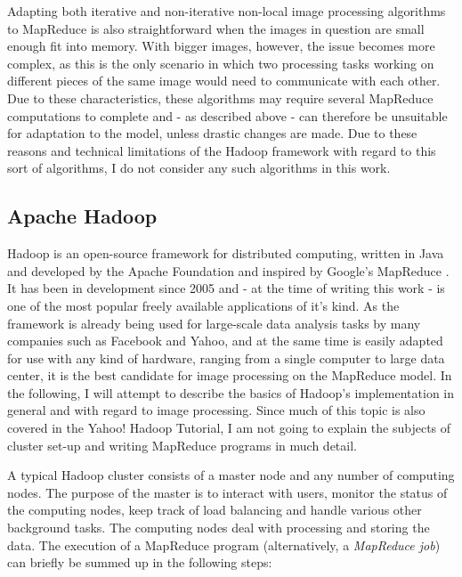 \documentclass [12pt,a4paper]{report}
\begin{document}
Adapting both iterative and non-iterative non-local image processing algorithms to MapReduce is also straightforward when the images in question are small enough fit into memory. With bigger images, however, the issue becomes more complex, as this is the only scenario in which two processing tasks working on different pieces of the same image would need to communicate with each other. Due to these characteristics, these algorithms may require several MapReduce computations to complete and - as described above - can therefore be unsuitable for adaptation to the model, unless drastic changes are made. Due to these reasons and technical limitations of the Hadoop framework with regard to this sort of algorithms, I do not consider any such algorithms in this work.

\subsection{Apache Hadoop}
Hadoop is an open-source framework for distributed computing, written in Java and developed by the Apache Foundation and inspired by Google's MapReduce \cite{white2012hadoop}. It has been in development since 2005 and - at the time of writing this work - is one of the most popular freely available applications of it's kind. As the framework is already being used for large-scale data analysis tasks by many companies such as Facebook and Yahoo, and at the same time is easily adapted for use with any kind of hardware, ranging from a single computer to large data center, it is the best candidate for image processing on the MapReduce model. In the following, I will attempt to describe the basics of Hadoop's implementation in general and with regard to image processing. Since much of this topic is also covered in the Yahoo! Hadoop Tutorial, I am not going to explain the subjects of cluster set-up and writing MapReduce programs in much detail.

A typical Hadoop cluster consists of a master node and any number of computing nodes. The purpose of the master is to interact with users, monitor the status of the computing nodes, keep track of load balancing and handle various other background tasks. The computing nodes deal with processing and storing the data. The execution of a MapReduce program (alternatively, a \textit{MapReduce job}) can briefly be summed up in the following steps:
\end{document}
